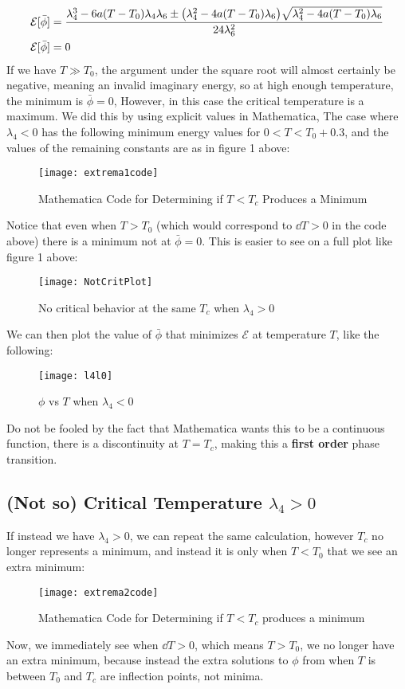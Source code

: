 \documentclass[12pt]{article}
\begin{document}
\begin{align*}
  \mathcal{E}[\bar\phi]&=
  \frac{\lambda_4^3-6a(T-T_0)\lambda_4\lambda_6
    \pm\qty(\lambda_4^2-4a(T-T_0)\lambda_6)
    \sqrt{\lambda_4^2-4a(T-T_0)\lambda_6}}
  {24\lambda_6^2}\\
  \mathcal{E}[\bar\phi]&=0
\end{align*}
If we have $T\gg T_0$, the argument under the square root will almost certainly be negative, meaning an invalid imaginary energy, so at high enough temperature, the minimum is $\bar\phi=0$, However, in this case the critical temperature is a maximum. We did this by using explicit values in Mathematica, The case where $\lambda_4<0$ has the following minimum energy values for $0<T<T_0+0.3$, and the values of the remaining constants are as in figure 1 above:
\begin{figure}[H]
  \centering
  \texttt{[image: extrema1code]}
  \caption{Mathematica Code for Determining if $T<T_c$ Produces a Minimum}
\end{figure}
Notice that even when $T>T_0$ (which would correspond to $\dd{T}>0$ in the code above) there is a minimum not at $\bar\phi=0$. This is easier to see on a full plot like figure 1 above:
\begin{figure}[H]
  \centering
  \texttt{[image: NotCritPlot]}
  \caption{No critical behavior at the same $T_c$ when $\lambda_4>0$}
\end{figure}

We can then plot the value of $\bar\phi$ that minimizes $\mathcal{E}$ at temperature $T$, like the following:
\begin{figure}[H]
  \centering
  \texttt{[image: l4l0]}
  \caption{$\phi$ vs $T$ when $\lambda_4<0$}
\end{figure}
Do not be fooled by the fact that Mathematica wants this to be a continuous function, there is a discontinuity at $T=T_c$, making this a \textbf{first order} phase transition.

\subsection{(Not so) Critical Temperature $\lambda_4>0$}
If instead we have $\lambda_4>0$, we can repeat the same calculation, however $T_c$ no longer represents a minimum, and instead it is only when $T<T_0$ that we see an extra minimum:
\begin{figure}[H]
  \centering
  \texttt{[image: extrema2code]}
  \caption{Mathematica Code for Determining if $T<T_c$ produces a minimum}
\end{figure}
Now, we immediately see when $\dd{T}>0$, which means $T>T_0$, we no longer have an extra minimum, because instead the extra solutions to $\phi$ from when $T$ is between $T_0$ and $T_c$ are inflection points, not minima.
\end{document}
